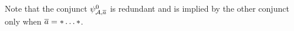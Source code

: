 \begin{enumerate}[1.]
\begin{enumerate}[(1)]
Note that the conjunct $\ityp{0}{\strct{A}, \vect{a}}$ is redundant and is implied by the other conjunct only when $\overline{a} = \ast \ldots \ast$.
\end{enumerate}
%
\end{enumerate}
